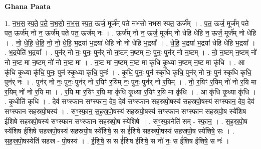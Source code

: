 \documentclass[17pt]{extarticle}
\begin{document}
\textbf{Ghana Paata } \newline

1. न॒भ॒स॒ स्प॒ते॒ प॒ते॒ न॒भ॒सो॒ न॒भ॒स॒ स्प॒त॒ ऊर्ज॒ मूर्ज॑म् पते नभसो नभस स्पत॒ ऊर्ज᳚म् । . प॒त॒ ऊर्ज॒ मूर्ज॑म् पते पत॒ ऊर्ज॑म् नो न॒ ऊर्ज॑म् पते पत॒ ऊर्ज॑म् नः । . ऊर्ज॑म् नो न॒ ऊर्ज॒ मूर्ज॑म् नो धेहि धेहि न॒ ऊर्ज॒ मूर्ज॑म् नो धेहि । . नो॒ धे॒हि॒ धे॒हि॒ नो॒ नो॒ धे॒हि॒ भ॒द्रया॑ भ॒द्रया॑ धेहि नो नो धेहि भ॒द्रया᳚ । . धे॒हि॒ भ॒द्रया॑ भ॒द्रया॑ धेहि धेहि भ॒द्रया᳚ । . भ॒द्रयेति॑ भ॒द्रया᳚ । . पुन॑र् नो नः॒ पुनः॒ पुन॑र् नो न॒ष्टम् न॒ष्टम् नः॒ पुनः॒ पुन॑र् नो न॒ष्टम् । . नो॒ न॒ष्टम् न॒ष्टम् नो॑ नो न॒ष्ट मा न॒ष्टम् नो॑ नो न॒ष्ट मा । . न॒ष्ट मा न॒ष्टम् न॒ष्ट मा कृ॑धि कृ॒ध्या न॒ष्टम् न॒ष्ट मा कृ॑धि । . आ कृ॑धि कृ॒ध्या कृ॑धि॒ पुनः॒ पुन॑ स्कृ॒ध्या कृ॑धि॒ पुनः॑ । . कृ॒धि॒ पुनः॒ पुन॑ स्कृधि कृधि॒ पुन॑र् नो नः॒ पुन॑ स्कृधि कृधि॒ पुन॑र् नः । . पुन॑र् नो नः॒ पुनः॒ पुन॑र् नो र॒यिꣳ र॒यिम् नः॒ पुनः॒ पुन॑र् नो र॒यिम् । . नो॒ र॒यिꣳ र॒यिम् नो॑ नो र॒यि मा र॒यिम् नो॑ नो र॒यि मा । . र॒यि मा र॒यिꣳ र॒यि मा कृ॑धि कृ॒ध्या र॒यिꣳ र॒यि मा कृ॑धि । . आ कृ॑धि कृ॒ध्या कृ॑धि । . कृ॒धीति॑ कृधि । . देव॑ सꣳस्फान सꣳस्फान॒ देव॒ देव॑ सꣳस्फान सहस्रपो॒षस्य॑ सहस्रपो॒षस्य॑ सꣳस्फान॒ देव॒ देव॑ सꣳस्फान सहस्रपो॒षस्य॑ । . सꣳ॒॒स्फा॒न॒ स॒ह॒स्र॒पो॒षस्य॑ सहस्रपो॒षस्य॑ सꣳस्फान सꣳस्फान सहस्रपो॒ष स्ये॑शिष ईशिषे सहस्रपो॒षस्य॑ सꣳस्फान सꣳस्फान सहस्रपो॒ष स्ये॑शिषे । . सꣳ॒॒स्फा॒नेति॑ सम् - स्फा॒न॒ । . स॒ह॒स्र॒पो॒ष स्ये॑शिष ईशिषे सहस्रपो॒षस्य॑ सहस्रपो॒ष स्ये॑शिषे॒ स स ई॑शिषे सहस्रपो॒षस्य॑ सहस्रपो॒ष स्ये॑शिषे॒ सः । . स॒ह॒स्र॒पो॒षस्येति॑ सहस्र - पो॒षस्य॑ । . ई॒शि॒षे॒ स स ई॑शिष ईशिषे॒ स नो॑ नः॒ स ई॑शिष ईशिषे॒ स नः॑ । \newline
\end{document}
